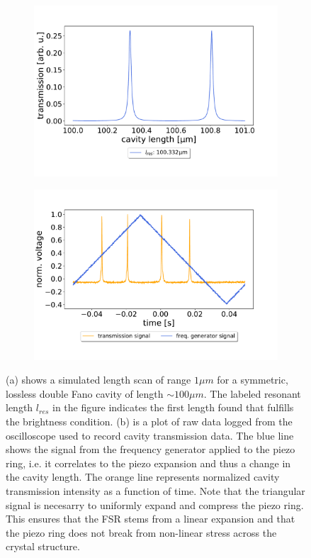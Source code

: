 \begin{figure}[h!]
    \centering
    \begin{subfigure}[b]{0.49\textwidth}
        \includegraphics[width=\textwidth]{figures/length_scan_symmetric_lossless.pdf}
        \caption{}
        \label{fig:length_scan_sim}
    \end{subfigure}
    \begin{subfigure}[b]{0.49\textwidth}
        \includegraphics[width=\textwidth]{figures/scope_screenshot.pdf}
        \caption{}
        \label{fig:lenght_scan_scope}
    \end{subfigure}
    \caption{(a) shows a simulated length scan  of range $1 \mu m$ for a symmetric, lossless double Fano cavity of length $\sim 100 \mu m$. The labeled resonant length $l_{res}$ in the figure indicates the first length found that fulfills the brightness condition. (b) is a plot of raw data logged from the oscilloscope used to record cavity transmission data. The blue line shows the signal from the frequency generator applied to the piezo ring, i.e. it correlates to the piezo expansion and thus a change in the cavity length. The orange line represents normalized cavity transmission intensity as a function of time. Note that the triangular signal is necesarry to uniformly expand and compress the piezo ring. This ensures that the FSR stems from a linear expansion and that the piezo ring does not break from non-linear stress across the crystal structure.}
    \label{fig:length_scan}
\end{figure}

